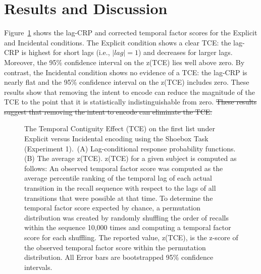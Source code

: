 \documentclass[man,natbib,floatsintext]{apa6} %
\begin{document}
\section{Results and Discussion}

Figure~\ref{e1_l1_crp} shows the lag-CRP and corrected temporal factor scores for the Explicit and Incidental conditions. The Explicit condition shows a clear TCE: the lag-CRP is highest for short lags (i.e., $|lag|=1$) and decreases for larger lags. Moreover, the 95\% confidence interval on the z(TCE) lies well above zero. By contrast, the Incidental condition shows no evidence of a TCE: the lag-CRP is nearly flat and the 95\% confidence interval on the z(TCE) includes zero. \color{red} These results show that removing the intent to encode can reduce the magnitude of the TCE to the point that it is statistically indistinguishable from zero.\color{black}  \st{These results suggest that removing the intent to encode can eliminate the TCE.}



\newcommand\paneltext{~(A) Lag-conditional response probability functions. (B) The average z(TCE). z(TCE) for a given subject is computed as follows: An observed temporal factor score was computed as the average percentile ranking of the temporal lag of each actual transition in the recall sequence with respect to the lags of all transitions that were possible at that time. To determine the temporal factor score expected by chance, a permutation distribution was created by randomly shuffling the order of recalls within the sequence 10,000 times and computing a temporal factor score for each shuffling. The reported value, z(TCE), is the z-score of the observed temporal factor score within the permutation distribution. All Error bars are bootstrapped 95\% confidence intervals.}
\begin{figure}
\caption{The Temporal Contiguity Effect (TCE) on the first list under Explicit versus Incidental encoding using the Shoebox Task (Experiment 1).\paneltext}
\label{e1_l1_crp}
\end{figure}
\end{document}
